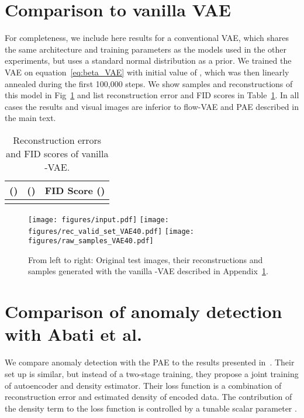 \documentclass[10pt]{article} \usepackage[accepted]{tmlr}
\newcommand{\rev}[1]{{\color{black}#1}}
\begin{document}
\section{Comparison to vanilla VAE}
\label{sec:VanillaVAE}
\rev{For completeness, we include here results for a conventional VAE, which shares the same architecture and training parameters as the models used in the other experiments, but uses a standard normal distribution as a prior. We trained the VAE on equation~\ref{eq:beta_VAE} with initial value of , which was then linearly annealed during the first 100,000 steps. We show samples and reconstructions of this model in Fig~\ref{fig:betaVAE} and list reconstruction error and FID scores in Table~\ref{tab:betaVAE}. In all cases the results and visual images are inferior to flow-VAE and PAE described in the main text. 
\begin{table}[h]
\begin{center}
\begin{tabular}{lll}
\multicolumn{1}{c|}{  ()}   &  \multicolumn{1}{c|}{  ()}         & \multicolumn{1}{c}{FID Score ()}\\ \hline
\multicolumn{1}{l|}{} & \multicolumn{1}{l|}{}       & \multicolumn{1}{l}{}
\end{tabular}
\end{center}
\caption{\label{tab:betaVAE} Reconstruction errors and FID scores of vanilla -VAE.}
\end{table}}
\begin{figure}
\begin{center}
\texttt{[image: figures/input.pdf]}
\texttt{[image: figures/rec\_valid\_set\_VAE40.pdf]}
\texttt{[image: figures/raw\_samples\_VAE40.pdf]}
\caption{From left to right: Original test images, their reconstructions and samples generated with the vanilla -VAE described in Appendix~\ref{sec:VanillaVAE}.}
\label{fig:betaVAE}
\end{center}
\end{figure}

\section{Comparison of anomaly detection with Abati et al.}
\label{app:AbatiComparison}
We compare anomaly detection with the PAE to the results presented in~\citet{AbatiPCC19}. Their set up is similar, but instead of a two-stage training, they propose a joint training of autoencoder and density estimator. Their loss function is a combination of reconstruction error and estimated density of encoded data. The contribution of the density term to the loss function is controlled by a tunable scalar parameter .
\end{document}
